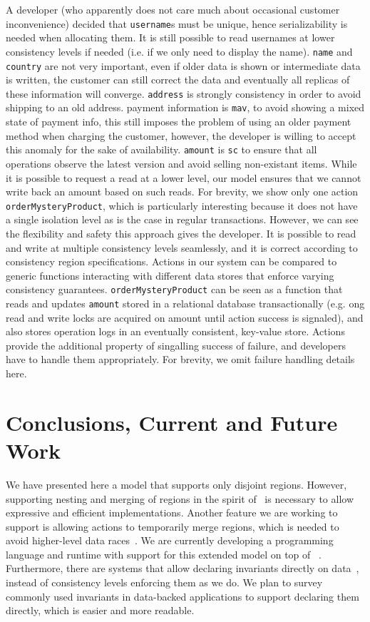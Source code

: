 \documentclass[preprint, numbers]{sigplanconf}
\begin{document}
A developer (who apparently does not care much about occasional customer inconvenience)
decided that \texttt{username}s must be unique, hence serializability is needed
when allocating them. It is still possible to read usernames at lower
consistency levels if needed (i.e. if we only need to display the name). \texttt{name} and \texttt{country} are not very important, even if older
data is shown or intermediate data is written, the customer can still correct
the data and eventually all replicas of these information will converge.
\texttt{address} is strongly consistency in order to avoid shipping to an old address.
payment information is \texttt{mav}, to avoid showing a mixed state of payment info, this still
imposes the problem of using an older payment method when charging the customer,
however, the developer is willing to accept this anomaly for the sake of
availability. \texttt{amount} is \texttt{sc} to ensure that all operations
observe the latest version and avoid selling non-existant items. While it is possible to request a read at a lower
level, our model ensures that we cannot write back an amount based on such reads. For brevity,
we show only one action \texttt{orderMysteryProduct}, which is particularly interesting because it does
not have a single isolation level as is the case in regular transactions.
However, we can see the flexibility and safety this approach gives the
developer. It is possible to read and write at multiple consistency levels
seamlessly, and it is correct according to consistency region specifications.
Actions in our system can be compared to generic functions interacting
with different data stores that enforce varying consistency guarantees.
\texttt{orderMysteryProduct}  can be seen as a function that
reads and updates \texttt{amount} stored in a relational database
transactionally (e.g. ong read and write locks are acquired on amount until
action success is signaled), and also stores operation logs in an eventually consistent,
key-value store. Actions provide the additional property of singalling success
of failure, and developers have to handle them appropriately. For brevity, we omit failure handling details here.

\section{Conclusions, Current and  Future Work}
We have presented here a model that supports only disjoint regions. However, supporting
nesting and merging of regions in the spirit of~\cite{dolby2012data} is necessary to allow expressive and efficient 
implementations. Another feature we are working to support is allowing actions to temporarily merge regions, which
is needed to avoid higher-level data races~\cite{artho2003high}. We are
currently developing a programming language and runtime with support for this extended model
on top of ~\cite{burckhardt2012cloud}. Furthermore, there are systems
that allow declaring invariants directly on data~\cite{bailis2015feral}, instead of 
consistency levels enforcing them as we do. We plan to survey commonly used
invariants in data-backed applications to support declaring them directly, which
is easier and more readable.
\end{document}
